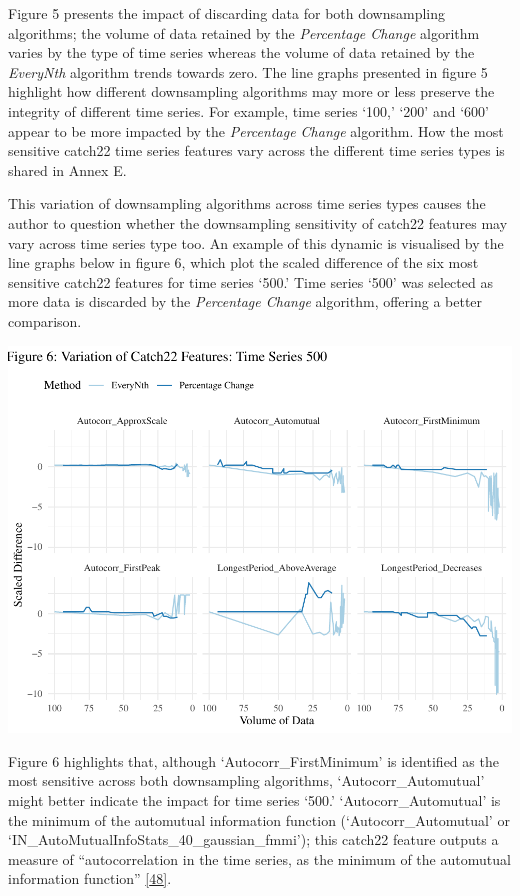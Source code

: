 \documentclass{article}
\begin{document}
Figure 5 presents the impact of discarding data for both downsampling
algorithms; the volume of data retained by the \emph{Percentage Change}
algorithm varies by the type of time series whereas the volume of data
retained by the \emph{EveryNth} algorithm trends towards zero. The line
graphs presented in figure 5 highlight how different downsampling
algorithms may more or less preserve the integrity of different time
series. For example, time series `100,' `200' and `600' appear to be
more impacted by the \emph{Percentage Change} algorithm. How the most
sensitive catch22 time series features vary across the different time
series types is shared in Annex E.

This variation of downsampling algorithms across time series types
causes the author to question whether the downsampling sensitivity of
catch22 features may vary across time series type too. An example of
this dynamic is visualised by the line graphs below in figure 6, which
plot the scaled difference of the six most sensitive catch22 features
for time series `500.' Time series `500' was selected as more data is
discarded by the \emph{Percentage Change} algorithm, offering a better
comparison.

\includegraphics{210431461_CSC8639_Dissertation_files/figure-latex/Catch22Variation-1.pdf}

Figure 6 highlights that, although `Autocorr\_FirstMinimum' is
identified as the most sensitive across both downsampling algorithms,
`Autocorr\_Automutual' might better indicate the impact for time series
`500.' `Autocorr\_Automutual' is the minimum of the automutual
information function (`Autocorr\_Automutual' or
`IN\_AutoMutualInfoStats\_40\_gaussian\_fmmi'); this catch22 feature
outputs a measure of ``autocorrelation in the time series, as the
minimum of the automutual information function''
\protect\hyperlink{ref-feature_book}{{[}48{]}}.
\end{document}
